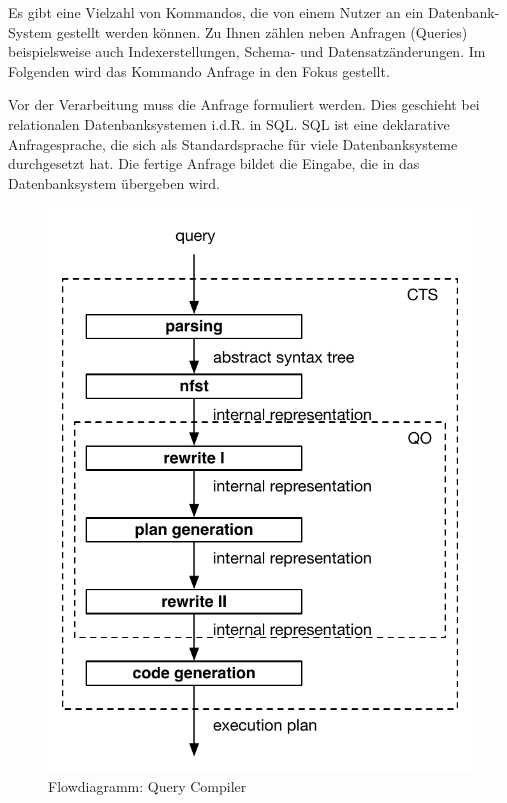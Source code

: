 Es gibt eine Vielzahl von Kommandos, die von einem Nutzer an ein Datenbank-System gestellt werden können. Zu Ihnen zählen neben Anfragen (Queries) beispielsweise auch Indexerstellungen, Schema- und Datensatzänderungen. Im Folgenden wird das Kommando Anfrage in den Fokus gestellt.

Vor der Verarbeitung muss die Anfrage formuliert werden. Dies geschieht bei relationalen Datenbanksystemen i.d.R. in \ac{SQL}. \ac{SQL} ist eine deklarative Anfragesprache, die sich als Standardsprache für viele Datenbanksysteme durchgesetzt hat. Die fertige Anfrage bildet die Eingabe, die in das Datenbanksystem übergeben wird. 


\begin{figure}[ht]
  \centering
  \includegraphics[scale=0.75]{02_Related_Work/QCArchitecture.pdf}
  \caption{Flowdiagramm: Query Compiler }
  \label{DBMS_Interpreter}
\end{figure}


